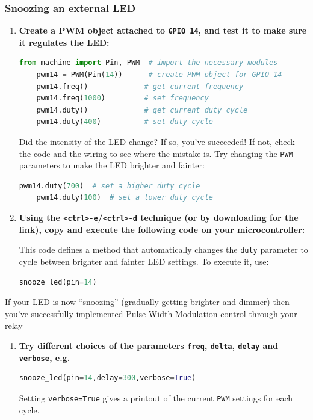 \subsubsection{\howto Snoozing an external LED}
\begin{enumerate}
	\item \textbf{Create a PWM object attached to \texttt{GPIO 14}, and test it to make sure it regulates the LED:}
	\begin{lstlisting}[language=Python]
	from machine import Pin, PWM  # import the necessary modules
	pwm14 = PWM(Pin(14))      # create PWM object for GPIO 14
	pwm14.freq()             # get current frequency
	pwm14.freq(1000)         # set frequency
	pwm14.duty()             # get current duty cycle
	pwm14.duty(400)          # set duty cycle
	\end{lstlisting}
	Did the intensity of the LED change? 
	If so, you've succeeded!
	If not, check the code and the wiring to see where the mistake is.
	\smallskip
	Try changing the \texttt{PWM} parameters to make the LED brighter and fainter: 
	\begin{lstlisting}[language=Python]
	pwm14.duty(700)  # set a higher duty cycle
	pwm14.duty(100)  # set a lower duty cycle
	\end{lstlisting}
	\item \textbf{Using the \texttt{<ctrl>-e}/\texttt{<ctrl>-d} technique (or by downloading for the link), copy and execute the following code on your microcontroller:}
	
	
	This code defines a method that automatically changes the \texttt{duty} parameter to cycle between brighter and fainter LED settings. 
	To execute it, use:
	\begin{lstlisting}[language=Python]
	snooze_led(pin=14)
	\end{lstlisting}
\end{enumerate}
If your LED is now “snoozing” (gradually getting brighter and dimmer) then you’ve successfully implemented Pulse Width Modulation control through your relay
\begin{enumerate}[resume]
	\item \textbf{Try different choices of the parameters \texttt{freq}, \texttt{delta}, \texttt{delay} and \texttt{verbose}, e.g.} 
	\begin{lstlisting}[language=Python]
	snooze_led(pin=14,delay=300,verbose=True)
	\end{lstlisting}
	Setting \lstinline{verbose=True} gives a printout of the current \texttt{PWM} settings for each cycle.
\end{enumerate}

